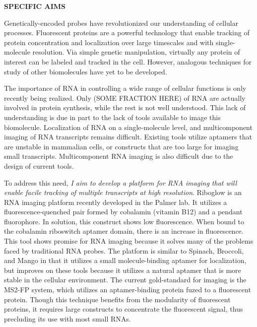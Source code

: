 \documentclass[11pt]{article}
\begin{document}



\noindent \begin{center}
{\bf SPECIFIC AIMS}
\end{center}

Genetically-encoded probes have revolutionized our understanding of cellular processes. Fluorescent proteins are a powerful technology that enable tracking of protein concentration and localization over large timescales and with single-molecule resolution. Via simple genetic manipulation, virtually any protein of interest can be labeled and tracked in the cell. However, analogous techniques for study of other biomolecules have yet to be developed.

The importance of RNA in controlling a wide range of cellular functions is only recently being realized. Only (SOME FRACTION HERE) of RNA are actually involved in protein synthesis, while the rest is not well understood. This lack of understanding is due in part to the lack of tools available to image this biomolecule. Localization of RNA on a single-molecule level, and multicomponent imaging of RNA transcripts remains difficult. Existing tools utilize aptamers that are unstable in mammalian cells, or constructs that are too large for imaging small transcripts. Multicomponent RNA imaging is also difficult due to the design of current tools.

To address this need, \textit{I aim to develop a platform for RNA imaging that will enable facile tracking of multiple transcripts at high resolution}. Riboglow is an RNA imaging platform recently developed in the Palmer lab. It utilizes a fluorescence-quenched pair formed by cobalamin (vitamin B12) and a pendant fluorophore. In solution, this construct shows low fluorescence. When bound to the cobalamin riboswitch aptamer domain, there is an increase in fluorescence. This tool shows promise for RNA imaging because it solves many of the problems faced by traditional RNA probes. The platform is similar to Spinach, Broccoli, and Mango in that it utilizes a small molecule-binding aptamer for localization, but improves on these tools because it utilizes a natural aptamer that is more stable in the cellular environment. The current gold-standard for imaging is the MS2-FP system, which utilizes an aptamer-binding protein fuzed to a fluorescent protein. Though this technique benefits from the modularity of fluorescent proteins, it requires large constructs to concentrate the fluorescent signal, thus precluding its use with most small RNAs.
\end{document}
